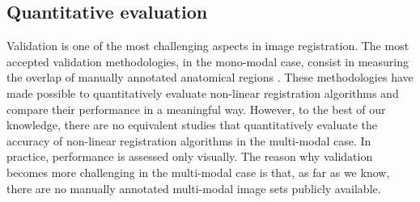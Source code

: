 
\vspace{-0.2cm}
\subsection{Quantitative evaluation}
Validation is one of the most challenging aspects in image registration. The most accepted validation methodologies, in the mono-modal case, consist in measuring the overlap of manually annotated anatomical regions \cite{Klein2009, Klein2010, Rohlfing2012}. These methodologies have made possible to quantitatively evaluate non-linear registration algorithms and compare their performance in a meaningful way. However, to the best of our knowledge, there are no equivalent studies that quantitatively evaluate the accuracy of non-linear registration algorithms in the multi-modal case. In practice, performance is assessed only visually. The reason why validation becomes more challenging in the multi-modal case is that, as far as we know, there are no manually annotated multi-modal image sets publicly available.

\vspace{-0.2cm}
